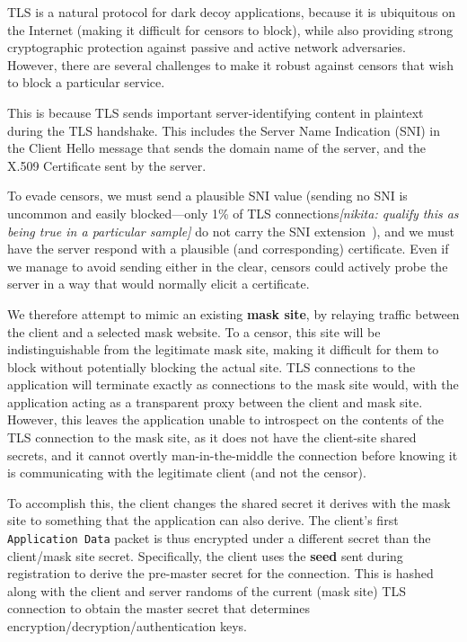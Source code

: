 \documentclass[letterpaper,twocolumn,10pt]{article}
\newcommand{\note}[2]{\textit{[#1: #2]}}
\newcommand{\nikita}[1]{\note{nikita}{#1}}
\begin{document}
TLS is a natural protocol for dark decoy applications, because it is ubiquitous on
the Internet (making it difficult for censors to block), while also providing
strong cryptographic protection against passive and active network adversaries.
However, there are several challenges to make it robust against censors that
wish to block a particular service.

This is because TLS sends important server-identifying content in plaintext
during the TLS handshake. This includes the Server Name Indication (SNI) in the
Client Hello message that sends the domain name of the server, and the
X.509 Certificate sent by the server.

To evade censors, we must send a plausible SNI value (sending no SNI is
uncommon and easily blocked---only 1\% of TLS connections\nikita{qualify this as being true in a particular sample} do not carry the
SNI extension~\cite{tls-fingerprint}), and we must have the server respond with
a plausible (and corresponding) certificate. Even if we manage to avoid sending
either in the clear, censors could actively probe the server in a
way that would normally elicit a certificate.


We therefore attempt to mimic an existing \textbf{mask site}, by relaying
traffic between the client and a selected mask website. To a censor, this site
will be indistinguishable from the legitimate mask site, making it difficult for
them to block without potentially blocking the actual site. TLS connections to the
application will terminate exactly as connections to the mask site would, with the
application acting as a transparent proxy between the client and mask site.
However, this leaves the application unable to introspect on the contents of the
TLS connection to the mask site, as it does not have the client-site shared
secrets, and it cannot overtly man-in-the-middle the connection before knowing
it is communicating with the legitimate client (and not the censor).


To accomplish this, the client changes the shared secret it derives with the
mask site to something that the application can also derive. The client's first
\texttt{Application Data} packet is thus encrypted under a different secret than
the client/mask site secret. Specifically, the client uses the \textbf{seed}
sent during registration to derive the pre-master secret for the connection.
This is hashed along with the client and server randoms of the current (mask
site) TLS connection to obtain the master secret that determines
encryption/decryption/authentication keys.
\end{document}
